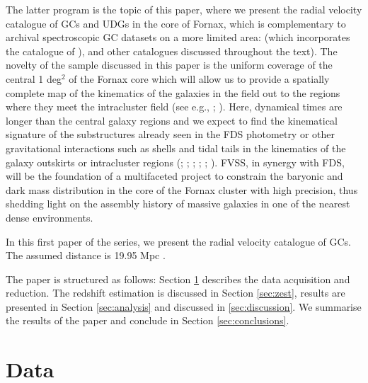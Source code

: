 \documentclass[useAMS,usenatbib]{mn2e}
\begin{document}
The latter program is the topic of this paper, where we present the radial 
velocity catalogue of GCs and UDGs in the core of Fornax, which is 
complementary to archival spectroscopic GC datasets on a more limited area: 
\citet{Schuberth} (which incorporates the catalogue of \citealt{Dirsch04}), 
\citet{Bergond07} and other catalogues discussed throughout the 
text). The novelty of the sample discussed in this paper is the uniform coverage 
of the central 1 deg$^2$ of the Fornax core which will allow us to provide a 
spatially complete map of the kinematics of the galaxies in the field out to 
the regions where they meet the intracluster field (see e.g., \citealt{napolitano03}
; \citealt{arnaboldi12}). Here, dynamical times are longer than the central 
galaxy regions and we expect to find the kinematical signature of the 
substructures already seen in the FDS photometry \citep{Iodice16} or other 
gravitational interactions such as shells and tidal tails in the kinematics of 
the galaxy outskirts or intracluster regions (\citealt{napolitano02,napolitano03}; 
\citealt{murante07}; \citealt{bullock05}; \citealt{rudick06}; 
\citealt{duc11}; \citealt{Longobardi15}). FVSS, in synergy with FDS, will be 
the foundation of a multifaceted project to constrain the baryonic and dark 
mass distribution in the core of the Fornax cluster with high precision, thus 
shedding light on the assembly history of massive galaxies in one of the 
nearest dense environments.

In this first paper of the series, we present the radial velocity catalogue of 
GCs. 
The assumed distance is 19.95 Mpc \citep{Tonry01}.

The paper is structured as follows: Section \ref{sec:data} describes the data 
acquisition and reduction. The redshift estimation is discussed in Section 
\ref{sec:zest}, results are presented in Section \ref{sec:analysis} and 
discussed in \ref{sec:discussion}. We summarise the results of the paper and 
conclude in Section \ref{sec:conclusions}. 

\section{Data}
\label{sec:data}
\end{document}

